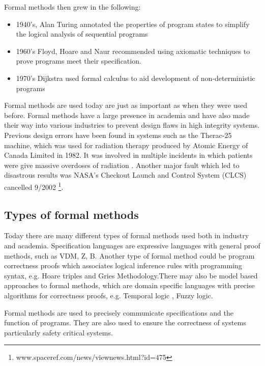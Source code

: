 Formal methods then grew in the following:

\begin{itemize}
\item 1940's, Alan Turing annotated the properties of program states to simplify the logical analysis of sequential programs

\item 1960's Floyd, Hoare and Naur recommended using axiomatic techniques to prove programs meet their specification.

\item 1970's Dijkstra used formal calculus to aid development of non-deterministic programs
\end{itemize}

Formal methods are used today are just as important as when they were used before. Formal methods have a large presence in academia and have also made their way into various industries to prevent design flaws in high integrity systems. Previous design errors have been found in systems such as the Therac-25 machine, which was used for radiation therapy produced by Atomic Energy of Canada Limited in 1982. It was involved in multiple incidents in which patients were give massive overdoses of radiation \cite{baase2003gift}. Another major fault which led to disastrous results was NASA’s Checkout Launch and Control System (CLCS) cancelled 9/2002 \footnote{www.spaceref.com/news/viewnews.html?id=475}.

\subsection{Types of formal methods}


Today there are many different types of formal methods used both in industry and academia. Specification languages are expressive languages with general proof methods, such as VDM, Z, B. Another type of formal method could be program correctness proofs which associates logical inference rules with programming syntax, e.g. Hoare triples and Gries Methodology.There may also be model based approaches to formal methods, which are domain specific languages with precise algorithms for correctness proofs, e.g. Temporal logic \cite{uwa}, Fuzzy logic.  

Formal methods are used to precisely communicate specifications and the function of programs. They are also used to ensure the correctness of systems particularly safety critical systems.

